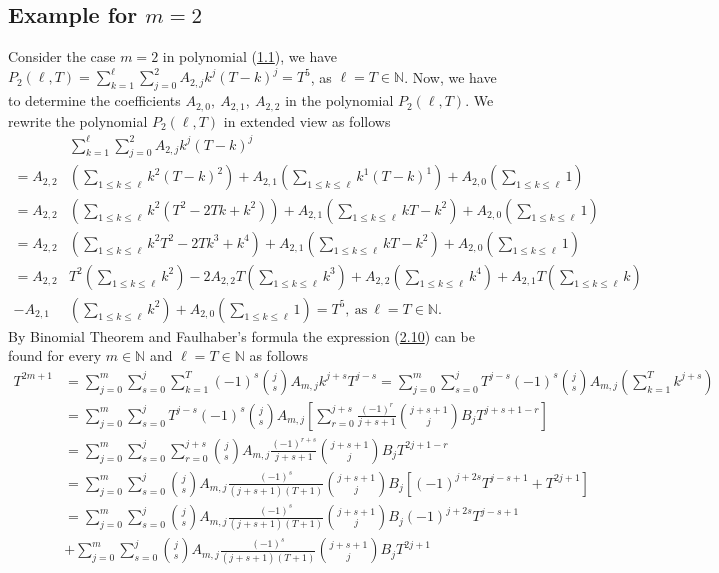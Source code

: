 \documentclass[11pt, letterpaper]{amsart} da da ya qq
\theoremstyle{definition}
\theoremstyle{remark}
\numberwithin{equation}{section}
\begin{document}
\subsection{Example for \texorpdfstring{$m=2$}{m=2}}
Consider the case $m=2$ in polynomial (\hyperref[f1]{1.1}), we have $P_2(\ell,T)=\sum_{k=1}^{\ell}\sum_{j=0}^2 A_{2,j}k^j(T-k)^j=T^5$, as $\ell=T\in\mathbb{N}$. Now, we have to determine the coefficients $A_{2,0}, \ A_{2,1}, \ A_{2,2}$ in the polynomial $P_2(\ell,T)$. We rewrite the polynomial $P_2(\ell,T)$ in extended view as follows
\begin{equation}\label{alb_3_1}
\begin{split}
&\sum_{k=1}^{\ell}\sum_{j=0}^2 A_{2,j}k^j(T-k)^j\\
=A_{2,2}&\left(\sum\limits_{1\leq k \leq \ell}k^2(T-k)^2\right)+A_{2,1}\left(\sum\limits_{1\leq k \leq \ell}k^1(T-k)^1\right)+A_{2,0}\left(\sum\limits_{1\leq k \leq \ell}1\right)\\
=A_{2,2}&\left(\sum\limits_{1\leq k \leq \ell} k^2(T^2-2Tk+k^2)\right)+A_{2,1}\left(\sum\limits_{1\leq k \leq \ell} kT-k^2\right) + A_{2,0}\left(\sum\limits_{1\leq k \leq \ell}1\right)\\
=A_{2,2}&\left(\sum\limits_{1\leq k \leq \ell} k^2T^2-2Tk^3+k^4\right)+A_{2,1}\left(\sum\limits_{1\leq k \leq \ell} kT-k^2\right) + A_{2,0}\left(\sum\limits_{1\leq k \leq \ell}1\right) \\
=A_{2,2}&T^2\left(\sum\limits_{1\leq k \leq \ell}k^2\right)-2A_{2,2}T\left(\sum\limits_{1\leq k \leq \ell}k^3\right)+A_{2,2}\left(\sum\limits_{1\leq k \leq \ell}k^4\right)+A_{2,1}T\left(\sum\limits_{1\leq k \leq \ell} k\right) \\
-A_{2,1}&\left(\sum\limits_{1\leq k \leq \ell}k^2\right)+A_{2,0}\left(\sum\limits_{1\leq k \leq \ell}1\right)=T^5, \ \mathrm{as} \ \ell=T\in\mathbb{N}.
\end{split}
\end{equation}
By Binomial Theorem and Faulhaber's formula the expression (\hyperref[alb_3_1]{2.10}) can be found for every $m\in\mathbb{N}$ and $\ell=T\in\mathbb{N}$ as follows
\begin{equation*}
\begin{split}
T^{2m+1}
&=\sum_{j=0}^{m}\sum_{s=0}^{j}\sum_{k=1}^{T}(-1)^s \binom{j}{s} A_{m,j} k^{j+s} T^{j-s}=\sum_{j=0}^{m}\sum_{s=0}^{j} T^{j-s}(-1)^s \binom{j}{s} A_{m,j}\left(\sum_{k=1}^{T} k^{j+s}\right)\\
&=\sum_{j=0}^{m}\sum_{s=0}^{j} T^{j-s}(-1)^s \binom{j}{s} A_{m,j}\left[\sum_{r=0}^{j+s}\frac{(-1)^r}{j+s+1}\binom{j+s+1}{j}B_{j}T^{j+s+1-r}\right]\\
&=\sum_{j=0}^{m}\sum_{s=0}^{j}\sum_{r=0}^{j+s}\binom{j}{s} A_{m,j}\frac{(-1)^{r+s}}{j+s+1}\binom{j+s+1}{j}B_{j}T^{2j+1-r}\\
&=\sum_{j=0}^{m}\sum_{s=0}^{j}\binom{j}{s} A_{m,j}\frac{(-1)^s}{(j+s+1)(T+1)}\binom{j+s+1}{j}B_{j}[(-1)^{j+2s}T^{j-s+1}+T^{2j+1}]\\
&=\sum_{j=0}^{m}\sum_{s=0}^{j}\binom{j}{s} A_{m,j}\frac{(-1)^s}{(j+s+1)(T+1)}\binom{j+s+1}{j}B_{j}(-1)^{j+2s}T^{j-s+1}\\
&+\sum_{j=0}^{m}\sum_{s=0}^{j}\binom{j}{s} A_{m,j}\frac{(-1)^s}{(j+s+1)(T+1)}\binom{j+s+1}{j}B_{j}T^{2j+1}
\end{split}
\end{equation*}
\end{document}
